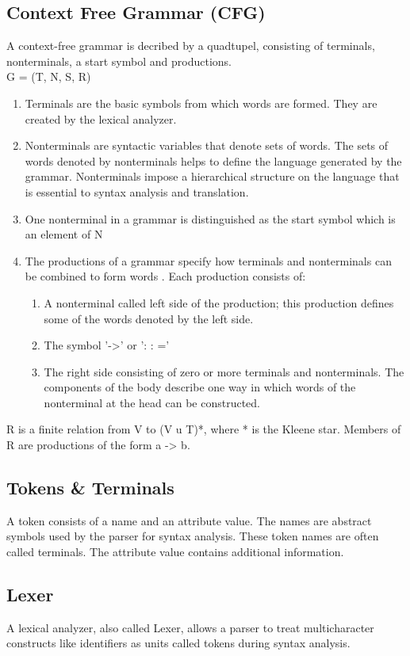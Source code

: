 \subsection{Context Free Grammar (CFG)}
A context-free grammar is decribed by a quadtupel, consisting of terminals, nonterminals, a start symbol and productions.
\\G = (T, N, S, R)
\begin{enumerate}
	\item Terminals are the basic symbols from which words are formed.  They are created by the lexical analyzer.
	\item Nonterminals are syntactic variables that denote sets of words. The sets of words denoted by nonterminals helps to define the language generated by the grammar. Nonterminals impose a hierarchical structure on the language that is essential to syntax analysis and translation.
	\item One nonterminal in a grammar is distinguished as the start symbol which is an element of N
	\item The productions of a grammar specify how terminals and nonterminals can be combined to form words . Each production consists of:
	\begin{enumerate}
		\item A nonterminal called left side of the production; this production defines some of the words denoted by the left side.
		\item The symbol '->'  or  ': : =' 
		\item The right side consisting of zero or more terminals and nonterminals. The components of the body describe one way in which words of the nonterminal at the head can be constructed.
	\end{enumerate}
\end{enumerate}
 R is a finite relation from V to (V u T)*, where * is the Kleene star. Members of R are productions of the form a -> b.\cite{DragonBook}


\subsection{Tokens \& Terminals}  
A token consists of a name and an attribute value. The names are abstract symbols used by the parser for syntax analysis. These token names are often called terminals. The attribute value contains additional information.\cite{DragonBook}


\subsection{Lexer}
A lexical analyzer, also called Lexer, allows a parser to treat multicharacter constructs like identifiers as units called tokens during syntax analysis.\cite{DragonBook}

